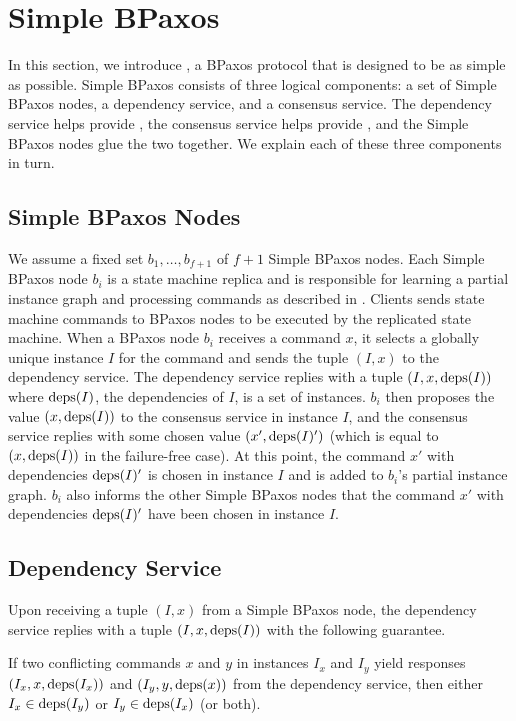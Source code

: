 \section{Simple BPaxos}
In this section, we introduce , a BPaxos protocol that
is designed to be as simple as possible.
%
Simple BPaxos consists of three logical components: a set of Simple BPaxos
nodes, a dependency service, and a consensus service. The dependency service
helps provide , the consensus service helps provide
, and the Simple BPaxos nodes glue the two together.
We explain each of these three components in turn.

\subsection{Simple BPaxos Nodes}
We assume a fixed set $b_1, \ldots, b_{f+1}$ of $f + 1$ Simple BPaxos nodes.
Each Simple BPaxos node $b_i$ is a state machine replica and is responsible for
learning a partial instance graph and processing commands as described in
.
%
Clients sends state machine commands to BPaxos nodes to be executed by the
replicated state machine. When a BPaxos node $b_i$ receives a command $x$, it
selects a globally unique instance $I$ for the command and sends the tuple $(I,
x)$ to the dependency service. The dependency service replies with a tuple $(I,
x, \text{deps}(I))$ where $\text{deps}(I)$, the dependencies of $I$, is a set of instances.
%
$b_i$ then proposes the value $(x, \text{deps}(I))$ to the consensus service in
instance $I$, and the consensus service replies with some chosen value $(x',
\text{deps}(I)')$ (which is equal to $(x, \text{deps}(I))$ in the failure-free case). At
this point, the command $x'$ with dependencies $\text{deps}(I)'$ is chosen in instance
$I$ and is added to $b_i$'s partial instance graph. $b_i$ also informs the
other Simple BPaxos nodes that the command $x'$ with dependencies $\text{deps}(I)'$
have been chosen in instance $I$.

\subsection{Dependency Service}
Upon receiving a tuple $(I, x)$ from a Simple BPaxos node, the dependency
service replies with a tuple $(I, x, \text{deps}(I))$ with the following guarantee.

\begin{invariant}
If two conflicting commands $x$ and $y$ in instances $I_x$ and $I_y$ yield
responses $(I_x, x, \text{deps}(I_x))$ and $(I_y, y, \text{deps}(x))$ from the dependency
service, then either $I_x \in \text{deps}(I_y)$ or $I_y \in \text{deps}(I_x)$ (or both).
\end{invariant}

